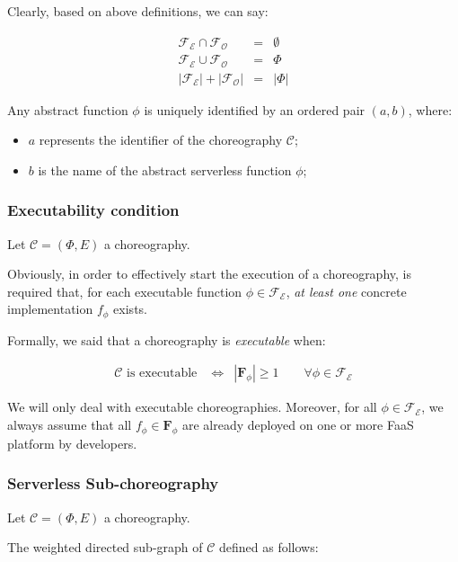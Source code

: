 Clearly, based on above definitions, we can say: 

\begin{eqnarray}
\mathscr{F_E} \cap \mathscr{F_O} & = & \emptyset \\
\mathscr{F_E} \cup \mathscr{F_O} & = & \Phi \\
|\mathscr{F_E}| + |\mathscr{F_O}| &=& |\Phi| 
\end{eqnarray}

Any abstract function $\phi$ is uniquely identified by an ordered pair $(a, b)$, where:
\begin{itemize}
	\item $a$ represents the identifier of the choreography $\mathcal{C}$;
	\item $b$ is the name of the abstract serverless function $\phi$;
\end{itemize}

\subsubsection{Executability condition}

Let $\mathcal{C} = (\Phi,E)$ a choreography.

Obviously, in order to effectively start the execution of a choreography, is required that, for each executable function $\phi \in \mathscr{F_E}$, \textit{at least one} concrete implementation $f_{\phi}$ exists.

Formally, we said that a choreography is \textit{executable} when: 

\begin{eqnarray}
	\label{eqn:SchedulabilityConditionOne}
	\mathcal{C} \text{ is executable } & \Leftrightarrow & |\textbf{F}_{\phi}| \geq 1 \qquad \forall \phi \in \mathscr{F_E}
\end{eqnarray}

We will only deal with executable choreographies. Moreover, for all $\phi \in \mathscr{F_E}$, we always assume that all $f_{\phi} \in \textbf{F}_{\phi}$ are already deployed on one or more FaaS platform by developers.

\subsubsection{Serverless Sub-choreography}

Let $\mathcal{C} = (\Phi,E)$ a choreography. 

The weighted directed sub-graph of $\mathcal{C}$ defined as follows:

